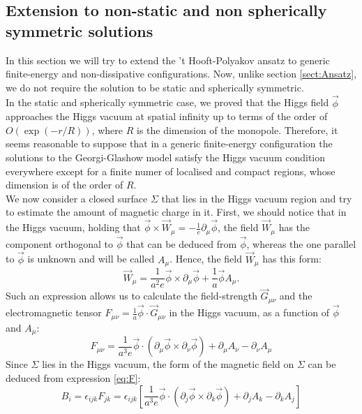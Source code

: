 \documentclass[main.tex]{subfiles}
\begin{document}
\subsection{Extension to non-static and non spherically symmetric solutions}
\label{sect:top}
In this section we will try to extend the 't Hooft-Polyakov ansatz to generic finite-energy and non-dissipative configurations. Now, unlike section \ref{sect:Ansatz}, we do not require the solution to be static and spherically symmetric. \\
In the static and spherically symmetric case, we proved that the Higgs field $\vec{\phi}$ approaches the Higgs vacuum at spatial infinity up to terms of the order of $O(\exp(-r/R))$, where $R$ is the dimension of the monopole.
Therefore, it seems reasonable to suppose that in a generic finite-energy configuration the solutions to the Georgi-Glashow model satisfy the Higgs vacuum condition everywhere except for a finite numer of localised and compact regions, whose dimension is of the order of $R$.\\
We now consider a closed surface $\Sigma$ that lies in the Higgs vacuum region and try to estimate the amount of magnetic charge in it. 
First, we should notice that in the Higgs vacuum, holding that $ \vec{\phi} \times \vec{W}_\mu = - \frac{1}{e} \partial_\mu \vec{\phi}$, the field $\vec{W}_\mu $ has the component orthogonal to $\vec{\phi}$ that can be deduced from $\vec{\phi}$, whereas the one parallel to $\vec{\phi}$ is unknown and will be called $A_\mu$. Hence, the field $\vec{W}_{\mu}$ has this form: 
\begin{equation}
\vec{W}_{\mu} = \frac{1}{a^2 e} \vec{\phi} \times \partial_\mu \vec{\phi} + \frac{1}{a}\vec{\phi} A_\mu . 
\end{equation}
Such an expression allows us to calculate the field-strength $\vec{G}_{\mu \nu}$ and the electromagnetic tensor $F_{\mu \nu} = \frac{1}{a} \vec{\phi}\cdot \vec{G}_{\mu \nu}$ in the Higgs vacuum, as a function of $\vec{\phi}$ and $A_\mu$: 
\begin{equation}
F_{\mu \nu}  = \frac{1}{a^3 e}\vec{\phi}\cdot \left(  \partial_\mu \vec{\phi}  \times  \partial_\nu \vec{\phi} \right) + \partial_\mu A_\nu -\partial_\nu A_\mu
\label{eq:F}
\end{equation}
Since $\Sigma $ lies in the Higgs vacuum, the form of the magnetic field on $\Sigma$ can be deduced from expression \ref{eq:F}:
\begin{equation}
B_i = \epsilon_{ijk} F_{jk} =   \epsilon_{ijk} \left[ \frac{1}{a^3 e} \vec{\phi}\cdot \left(  \partial_j \vec{\phi}  \times  \partial_k \vec{\phi} \right) + \partial_j A_k -\partial_k A_j \right]
\end{equation}
\end{document}
